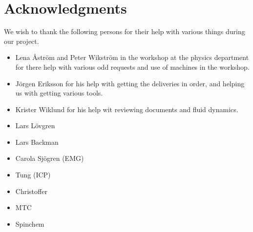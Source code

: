 \section*{Acknowledgments}
We wish to thank the following persons for their help with various things during our project.
\begin{itemize}
\item Lena Åström and Peter Wikström in the workshop at the physics department for there help with various odd requests and use of machines in the workshop.

\item   Jörgen Eriksson for his help with getting the deliveries in order, and helping us with getting various tools.

\item   Krister Wiklund for his help wit reviewing documents and fluid dynamics.

\item   Lars Lövgren

\item   Lars Backman

\item   Carola Sjögren (EMG)

\item   Tung (ICP)

\item   Christoffer

\item   MTC

\item   Spinchem
\end{itemize}

